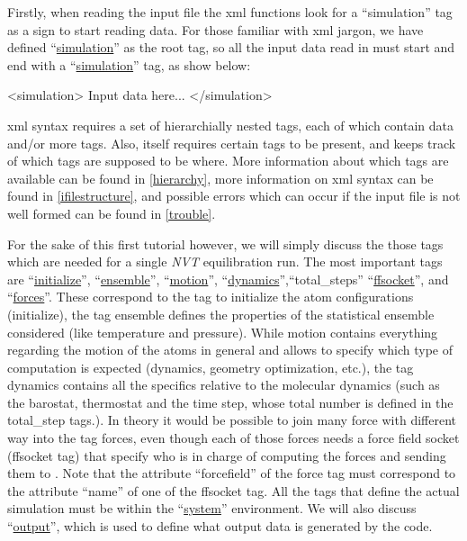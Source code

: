 \documentclass[11pt,english,fleqn]{report}
\newenvironment{code}{%
\footnotesize
\verbatim
}{
\endverbatim
\normalsize
}
\begin{document}
Firstly, when reading the input file the \ipi xml functions look
for a {}``simulation''
tag as a sign to start reading data. For those familiar with xml jargon,
we have defined {}``\hyperref[SIMULATION]{simulation}'' as the
root tag, so all the input data read in must start and end with a
{}``\hyperref[SIMULATION]{simulation}'' tag, as show below:

\begin{code}
<simulation>
   Input data here...
</simulation>
\end{code}

xml syntax requires a set of hierarchially nested tags, each of which
contain data and/or more tags. Also, \ipi itself requires certain
tags to be present, and keeps track of which tags are supposed to
be where. More information about which tags are available can be found
in \ref{hierarchy}, more information on xml syntax can be found in
\ref{ifilestructure}, and possible errors which can occur if the
input file is not well formed can be found in \ref{trouble}.

For the sake of this first tutorial however, we will simply discuss the
those tags which are needed for a single \emph{NVT} equilibration run.
The most important tags are {}``\hyperref[INITIALIZER]{initialize}'',
{}``\hyperref[ENSEMBLE]{ensemble}'', {}``\hyperref[MOTION]{motion}'',
{}``\hyperref[DYNAMICS]{dynamics}'',{}``total\_steps''
{}``\hyperref[FFSOCKET]{ffsocket}'',
 and {}``\hyperref[FORCES]{forces}''.
These correspond to the tag to initialize the atom configurations (initialize),
the tag ensemble defines the properties of the statistical ensemble considered (like
temperature and pressure). While motion contains everything regarding
the motion of the atoms in general and allows to specify
which type of computation is expected (dynamics, geometry
optimization, etc.), the tag dynamics contains all the specifics
relative to the molecular dynamics (such as the barostat,
thermostat and the time step, whose total number is defined in
the total\_step tags.). In theory it would be possible to join many
force with different way into the tag forces, even though each of those
forces needs a force field socket (ffsocket tag) that specify who is
in charge of computing the forces and sending them to \ipi.  Note that
the attribute ``forcefield'' of the force tag must correspond to the
attribute ``name'' of one of the ffsocket tag. All the tags that
define the actual simulation must be within the {}``\hyperref[SYSTEM]{system}''
environment.
We will also discuss {}``\hyperref[OUTPUTS]{output}'',
which is used to define what output data
is generated by the code.
\end{document}
